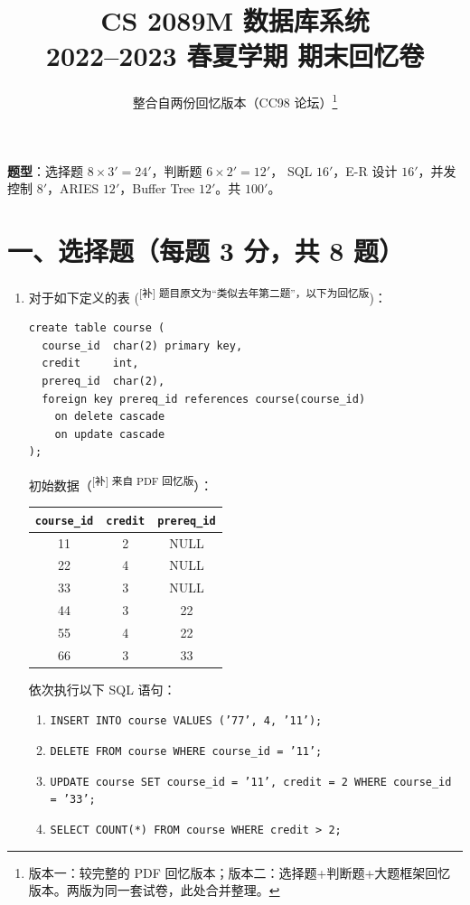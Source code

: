 \documentclass[11pt,a4paper]{article}
\title{CS 2089M 数据库系统\\2022--2023 春夏学期 期末回忆卷}
\author{整合自两份回忆版本（CC98 论坛）\thanks{版本一：较完整的 PDF 回忆版本；版本二：选择题+判断题+大题框架回忆版本。两版为同一套试卷，此处合并整理。}}
\date{}
\newcommand{\supp}[1]{\textcolor{ansred}{\textsuperscript{[补] #1}}}
\begin{document}
\maketitle

\vspace{-8pt}
\begin{center}
\textbf{题型}：选择题 $8\times 3' = 24'$，判断题 $6\times 2' = 12'$，
SQL $16'$，E-R 设计 $16'$，并发控制 $8'$，ARIES $12'$，Buffer Tree $12'$。共 $100'$。
\end{center}

\section*{一、选择题（每题 3 分，共 8 题）}

\begin{enumerate}[leftmargin=*,itemsep=8pt]

\item 对于如下定义的表 (\supp{题目原文为``类似去年第二题''，以下为回忆版})：
{\small
\begin{verbatim}
create table course (
  course_id  char(2) primary key,
  credit     int,
  prereq_id  char(2),
  foreign key prereq_id references course(course_id)
    on delete cascade
    on update cascade
);
\end{verbatim}}

初始数据（\supp{来自 PDF 回忆版}）：

\begin{tabular}{c|c|c}
\texttt{course\_id} & \texttt{credit} & \texttt{prereq\_id} \\
\midrule
11 & 2 & NULL \\
22 & 4 & NULL \\
33 & 3 & NULL \\
44 & 3 & 22   \\
55 & 4 & 22   \\
66 & 3 & 33   \\
\end{tabular}

依次执行以下 SQL 语句：
{\small
\begin{enumerate}[label=(\arabic*),nosep]
  \item \texttt{INSERT INTO course VALUES ('77', 4, '11');}
  \item \texttt{DELETE FROM course WHERE course\_id = '11';}
  \item \texttt{UPDATE course SET course\_id = '11', credit = 2
          WHERE course\_id = '33';}
  \item \texttt{SELECT COUNT(*) FROM course WHERE credit > 2;}
\end{enumerate}}


\end{enumerate}
\end{document}
